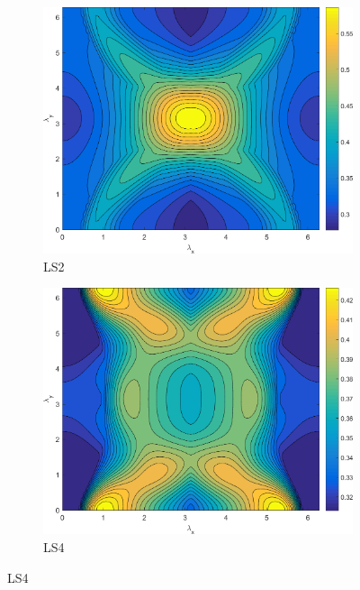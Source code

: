 \begin{figure}
\centering
	{
	\begin{subfigure}[b]{0.485\textwidth}
		\centering
		\includegraphics[width=\textwidth]{figures/sec_DSA/MODPHI_SI_MIP_C=4_UPWLD1_ncells=2_LS2_sigt=10_c=9_contour.png}
		\caption{LS2}
	\end{subfigure}
	\hfill
	\begin{subfigure}[b]{0.485\textwidth}
		\centering
		\includegraphics[width=\textwidth]{figures/sec_DSA/MODPHI_SI_MIP_C=4_UPWLD1_ncells=2_LS4_sigt=10_c=9_contour.png}
		\caption{LS4}
	\end{subfigure}
}
\end{figure}
